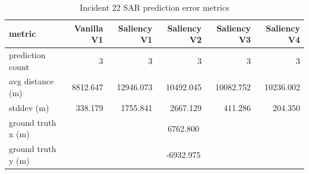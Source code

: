 \begin{table}[ht]
\centering
\caption{Incident 22 SAR prediction error metrics}
\label{tab:sar-incident-22}
\begin{tabular}{lrrrrr}
\hline
metric & Vanilla V1 & Saliency V1 & Saliency V2 & Saliency V3 & Saliency V4 \\
\hline
prediction count & 3 & 3 & 3 & 3 & 3 \\
avg distance (m) & 8812.647 & 12946.073 & 10492.045 & 10082.752 & 10236.002 \\
stddev (m) & 338.179 & 1755.841 & 2667.129 & 411.286 & 204.350 \\
ground truth x (m) & \multicolumn{5}{c}{6762.800} \\
ground truth y (m) & \multicolumn{5}{c}{-6932.975} \\
\hline
\end{tabular}
\end{table}
